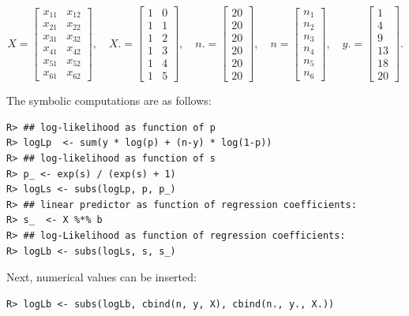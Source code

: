 \[
 X=\left[\begin{matrix}x_{11} & x_{12}\\x_{21} & x_{22}\\x_{31} & x_{32}\\x_{41} & x_{42}\\x_{51} & x_{52}\\x_{61} & x_{62}\end{matrix}\right], \quad
 X.=\left[\begin{matrix}1 & 0\\1 & 1\\1 & 2\\1 & 3\\1 & 4\\1 & 5\end{matrix}\right], \quad
 n.=\left[\begin{matrix}20\\20\\20\\20\\20\\20\end{matrix}\right], \quad
 n=\left[\begin{matrix}n_{1}\\n_{2}\\n_{3}\\n_{4}\\n_{5}\\n_{6}\end{matrix}\right], \quad
 y.=\left[\begin{matrix}1\\4\\9\\13\\18\\20\end{matrix}\right] .
\]

The symbolic computations are as follows:

\begin{verbatim}
R> ## log-likelihood as function of p
R> logLp  <- sum(y * log(p) + (n-y) * log(1-p))
R> ## log-likelihood as function of s
R> p_ <- exp(s) / (exp(s) + 1)
R> logLs <- subs(logLp, p, p_)
R> ## linear predictor as function of regression coefficients:
R> s_  <- X %*% b
R> ## log-Likelihood as function of regression coefficients:
R> logLb <- subs(logLs, s, s_)
\end{verbatim}

Next, numerical values can be inserted:

\begin{verbatim}
R> logLb <- subs(logLb, cbind(n, y, X), cbind(n., y., X.))
\end{verbatim}

